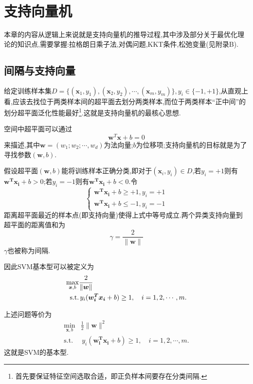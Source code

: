 \chapter{支持向量机}

本章的内容从逻辑上来说就是支持向量机的推导过程,其中涉及部分关于最优化理论的知识点,需要掌握:拉格朗日乘子法,对偶问题,KKT条件,松弛变量(见附录B).

\section{间隔与支持向量}

给定训练样本集$D=\{(\bm x_1, y_1),(\bm x_2, y_2),\cdots,(\bm x_m, y_m)\},y_i\in\{-1,+1\}$,从直观上看,应该去找位于两类样本间的超平面去划分两类样本,而位于两类样本``正中间''的划分超平面泛化性能最好\footnote{首先要保证特征空间选取合适，即正负样本间要存在分类间隔.}.这就是支持向量机的最核心思想.

空间中超平面可以通过
\begin{equation}
    \bm {w}^T\bm{x}+b=0
\end{equation}
来描述,其中$\mathbf w=(w_1;w_2;\cdots,w_d)$为法向量;$b$为位移项;支持向量机的目标就是为了寻找参数$(\mathbf w,b)$.

假设超平面$(\mathbf w,b)$能将训练样本正确分类,即对于$(\bm x_i,y_i)\in D$,若$y_i=+1$则有$\bm {w^Tx_i}+b>0$;若$y_i=-1$则有$\bm{w^Tx_i}+b<0$.令
\begin{equation}
\left\{
\begin{array}{ll}
\bm{w^Tx_i}+b\ge +1,y_i=+1 \\
\bm{w^Tx_i}+b\le -1,y_i=-1
\end{array}
\right.
\end{equation}
距离超平面最近的样本点(即支持向量)使得上式中等号成立.两个异类支持向量到超平面的距离值和为
\begin{equation}
\gamma=\frac{2}{\|\bm w\|}
\end{equation}
$\gamma$也被称为间隔.

因此SVM基本型可以被定义为
\begin{equation}\begin{split}
\max_{\bm x,b}&\frac{2}{\|\bm w\|} \\
\text{\text{s.t.}}& \,y_i(\bm{w_i^Tx_i}+b)\ge 1,\quad i=1,2,\cdots,m.
\end{split}\end{equation}

上述问题等价为
\begin{equation}\begin{split}
\min_{\bm x,b}&\frac{1}{2}\|\bm w\|^2 \\
\text{s.t.}& \,y_i(\bm{w_i^Tx_i}+b)\ge 1,\quad i=1,2,\cdots,m.
\end{split}\end{equation}
这就是SVM的基本型.

